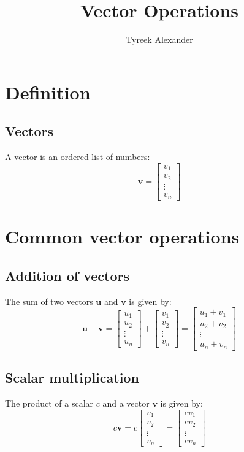 \documentclass{article}
\begin{document}
\title{Vector Operations}
\author{Tyreek Alexander}
\date{}
\maketitle

\section*{Definition}

\subsection*{Vectors}
A vector is an ordered list of numbers:
\[
\mathbf{v} = \begin{bmatrix} v_1 \\ v_2 \\ \vdots \\ v_n \end{bmatrix}
\]

\section*{Common vector operations}

\subsection*{Addition of vectors}
The sum of two vectors \(\mathbf{u}\) and \(\mathbf{v}\) is given by:
\[
\mathbf{u} + \mathbf{v} = \begin{bmatrix} u_1 \\ u_2 \\ \vdots \\ u_n \end{bmatrix} + \begin{bmatrix} v_1 \\ v_2 \\ \vdots \\ v_n \end{bmatrix} = \begin{bmatrix} u_1 + v_1 \\ u_2 + v_2 \\ \vdots \\ u_n + v_n \end{bmatrix}
\]

\subsection*{Scalar multiplication}
The product of a scalar \(c\) and a vector \(\mathbf{v}\) is given by:
\[
c \mathbf{v} = c \begin{bmatrix} v_1 \\ v_2 \\ \vdots \\ v_n \end{bmatrix} = \begin{bmatrix} c v_1 \\ c v_2 \\ \vdots \\ c v_n \end{bmatrix}
\]
\end{document}

